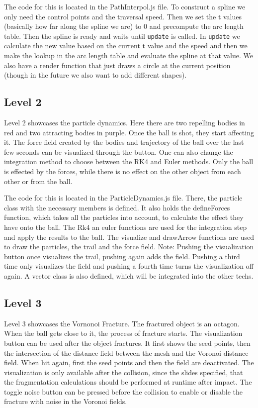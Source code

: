 \documentclass{article}
\begin{document}
The code for this is located in the PathInterpol.js file. To construct a spline we only need the control points and 
the traversal speed. Then we set the t values (basically how far along the spline we are) to $0$ and 
precompute the arc length table. Then the spline is ready and waits until \texttt{update} is called. 
In \texttt{update} we calculate the new value based on the current t value and the speed and then we make the 
lookup in the arc length table and evaluate the spline at that value. We also have a render function 
that just draws a circle at the current position (though in the future we also want to add different shapes).

\subsection{Level 2}
Level 2 showcases the particle dynamics. Here there are two repelling bodies in red and two attracting bodies in purple. Once the ball is shot, they start affecting it. The force field created by the bodies and trajectory of the ball over the last few seconds can be visualized through the button. One can also change the integration method to choose between the RK4 and Euler methods. Only the ball is effected by the forces, while there is no effect on the other object from each other or from the ball.  \newline

The code for this is located in the ParticleDynamics.js file. There, the particle class with the necessary members is defined. It also holds the defineForces function, which takes all the particles into account, to calculate the effect they have onto the ball. The Rk4 an euler functions are used for the integration step and apply the results to the ball. The visualize and drawArrow functions are used to draw the particles, the trail and the force field. 
Note: Pushing the visualization button once visualizes the trail, pushing again adds the field. Pushing a third time only visualizes the field and pushing a fourth time turns the visualization off again. 
A vector class is also defined, which will be integrated into the other techs. 

\subsection{Level 3}
Level 3 showcases the Vornonoi Fracture. The fractured object is an octagon. When the ball gets close to it, the process of fracture starts. The visualization button can be used after the object fractures. It first shows the seed points, then the intersection of the distance field between the mesh and the Voronoi distance field. When hit again, first the seed points and then the field are deactivated. The visualization is only available after the collision, since the slides specified, that the fragmentation calculations should be performed at runtime after impact. The toggle noise button can be pressed before the collision to enable or disable the fracture with noise in the Voronoi fields.
\end{document}
